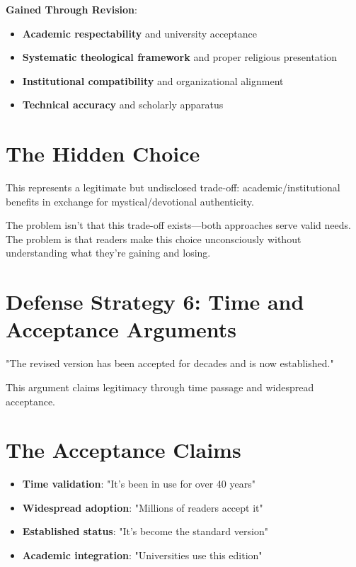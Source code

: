 \documentclass[11pt,twoside]{book}
\begin{document}
\textbf{\textbf{Gained Through Revision}}:
\begin{itemize}
\item \textbf{\textbf{Academic respectability}} and university acceptance
\item \textbf{\textbf{Systematic theological framework}} and proper religious presentation
\item \textbf{\textbf{Institutional compatibility}} and organizational alignment
\item \textbf{\textbf{Technical accuracy}} and scholarly apparatus
\end{itemize}
\section*{The Hidden Choice}
\label{sec:org3ea06ee}
This represents a legitimate but undisclosed trade-off: academic/institutional benefits in exchange for mystical/devotional authenticity.

The problem isn't that this trade-off exists—both approaches serve valid needs. The problem is that readers make this choice unconsciously without understanding what they're gaining and losing.
\section*{Defense Strategy 6: Time and Acceptance Arguments}
\label{sec:orgd2acf4c}

"The revised version has been accepted for decades and is now established."

This argument claims legitimacy through time passage and widespread acceptance.
\section*{The Acceptance Claims}
\label{sec:org991fe7b}
\begin{itemize}
\item \textbf{\textbf{Time validation}}: "It's been in use for over 40 years"
\item \textbf{\textbf{Widespread adoption}}: "Millions of readers accept it"
\item \textbf{\textbf{Established status}}: "It's become the standard version"
\item \textbf{\textbf{Academic integration}}: "Universities use this edition"
\end{itemize}
\end{document}
